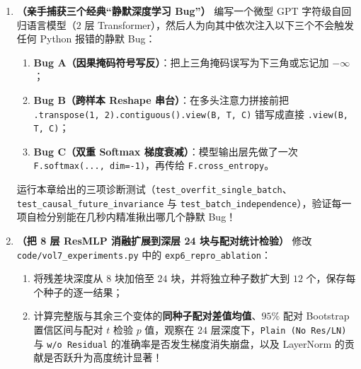 
\begin{enumerate}[label=\textbf{7.6.\arabic*}, start=5]
  \item \textbf{（亲手捕获三个经典“静默深度学习 Bug”）} 编写一个微型 GPT 字符级自回归语言模型（$2$ 层 Transformer），然后人为向其中依次注入以下三个不会触发任何 Python 报错的静默 Bug：
  \begin{enumerate}
    \item \textbf{Bug A（因果掩码符号写反）}：把上三角掩码误写为下三角或忘记加 $-\infty$；
    \item \textbf{Bug B（跨样本 Reshape 串台）}：在多头注意力拼接前把 \texttt{.transpose(1, 2).\allowbreak contiguous().\allowbreak view(B, T, C)} 错写成直接 \texttt{.view(B, T, C)}；
    \item \textbf{Bug C（双重 Softmax 梯度衰减）}：模型输出层先做了一次 \texttt{F.softmax(..., dim=-1)}，再传给 \texttt{F.cross\_entropy}。
  \end{enumerate}
  运行本章给出的三项诊断测试（\texttt{test\_overfit\_\allowbreak single\_batch}、\texttt{test\_causal\_\allowbreak future\_invariance} 与 \texttt{test\_batch\_\allowbreak independence}），验证每一项自检分别能在几秒内精准揪出哪几个静默 Bug！

  \item \textbf{（把 8 层 ResMLP 消融扩展到深层 24 块与配对统计检验）} 修改 \texttt{code/vol7\_experiments.py} 中的 \texttt{exp6\_repro\_ablation}：
  \begin{enumerate}
    \item 将残差块深度从 $8$ 块加倍至 $24$ 块，并将独立种子数扩大到 $12$ 个，保存每个种子的逐一结果；
    \item 计算完整版与其余三个变体的\textbf{同种子配对差值均值}、$95\%$ 配对 Bootstrap 置信区间与配对 $t$ 检验 $p$ 值，观察在 $24$ 层深度下，\texttt{Plain (No Res/LN)} 与 \texttt{w/o Residual} 的准确率是否发生梯度消失崩盘，以及 LayerNorm 的贡献是否跃升为高度统计显著！
  \end{enumerate}
\end{enumerate}


